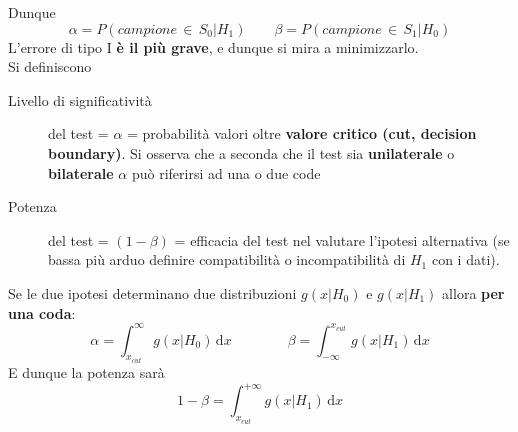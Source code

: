 \documentclass[10pt, oneside]{book}
\newcommand{\integral}[4]{\int_{#1}^{#2} #3 \, \mathrm{d}#4}
\begin{document}
Dunque
\[\alpha = P(campione \, \in \, S_0 \big| H_1) \qquad \beta = P(campione \, \in \, S_1 \big| H_0)\]
L'errore di tipo I \textbf{è il più grave}, e dunque si mira a minimizzarlo.\\
Si definiscono
\begin{description}
\item[Livello di significatività] del test = $\alpha$ = probabilità valori oltre \textbf{valore critico (cut, decision boundary)}. Si osserva che a seconda che il test sia \textbf{unilaterale} o \textbf{bilaterale} $\alpha$ può riferirsi ad una o due code
\item[Potenza] del test = $(1-\beta)$ = efficacia del test nel valutare l'ipotesi alternativa (se bassa più arduo definire compatibilità o incompatibilità di $H_1$ con i dati).
\end{description}
Se le due ipotesi determinano due distribuzioni $g(x|H_0)$ e $g(x|H_1)$ allora \textbf{per una coda}:
\[\alpha = \integral{x_{cut}}{\infty}{g(x|H_0)}{x} \qquad \qquad \beta = \integral{-\infty}{x_{cut}}{g(x|H_1)}{x}\]
E dunque la potenza sarà
\[1 - \beta = \integral{x_{cut}}{+\infty}{g(x|H_1)}{x}\]
\end{document}
